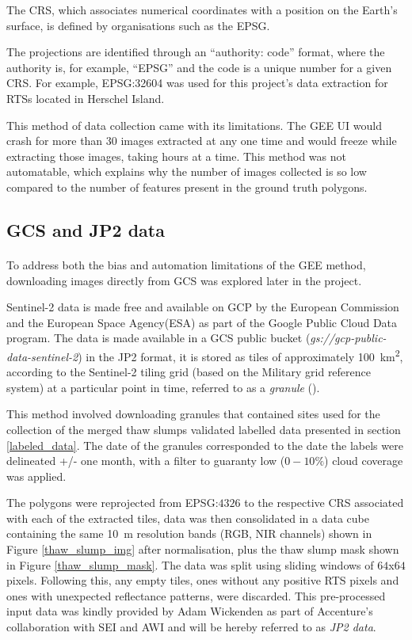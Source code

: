 The \gls{CRS}, which associates numerical coordinates with a position on the Earth's surface, is defined by organisations such as the \gls{EPSG}.

The projections are identified through an “authority: code” format, where the authority is, for example, “\gls{EPSG}” and the code is a unique number for a given \gls{CRS}. For example, \gls{EPSG}:32604 was used for this project's data extraction for \gls{RTS}s located in Herschel Island.

This method of data collection came with its limitations. The \gls{GEE} \gls{UI} would crash for more than 30 images extracted at any one time and would freeze while extracting those images, taking hours at a time. This method was not automatable, which explains why the number of images collected is so low compared to the number of features present in the ground truth polygons.

\subsection{\gls{GCS} and \gls{JP2} data}
\paragraph{}
To address both the bias and automation limitations of the \gls{GEE} method, downloading images directly from \gls{GCS} was explored later in the project.

Sentinel-2 data is made free and available on \gls{GCP} by the European Commission and the European Space Agency(ESA) as part of the Google Public Cloud Data program. The data is made available in a \gls{GCS} public bucket (\textit{gs://gcp-public-data-sentinel-2}) in the \gls{JP2} format, it is stored as tiles of approximately \SI{100}{\kilo\metre\squared}, according to the Sentinel-2 tiling grid (based on the Military grid reference system) at a particular point in time, referred to as a \textit{granule} (\cite{sentinel2_gcp}).

This method involved downloading granules that contained sites used for the collection of the merged thaw slumps validated labelled data presented in section \ref{labeled_data}. The date of the granules corresponded to the date the labels were delineated +/- one month, with a filter to guaranty low ($0-10\%$) cloud coverage was applied.

The polygons were reprojected from \gls{EPSG}:$4326$ to the respective \gls{CRS} associated with each of the extracted tiles, data was then consolidated in a data cube containing the same \SI{10}{\metre} resolution bands (\gls{RGB}, \gls{NIR} channels) shown in Figure \ref{thaw_slump_img} after normalisation, plus the thaw slump mask shown in Figure \ref{thaw_slump_mask}. The data was split using sliding windows of $64$x$64$ pixels. Following this, any empty tiles, ones without any positive \gls{RTS} pixels and ones with unexpected reflectance patterns, were discarded. This pre-processed input data was kindly provided by Adam Wickenden as part of Accenture's collaboration with \gls{SEI} and \gls{AWI} and will be hereby referred to as \textit{\gls{JP2} data}.

